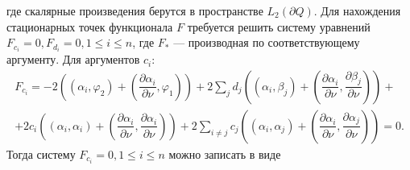 \documentclass[a4paper]{article}
\begin{document}
где скалярные произведения берутся в пространстве $L_2(\partial Q)$.
Для нахождения стационарных точек функционала $F$ требуется решить систему уравнений $F_{c_i}=0, F_{d_i}=0, 1\leq i \leq n$, где
$F_*$ --- производная по соответствующему аргументу. Для аргументов $c_i$:
\begin{multline}
  F_{c_i}=-2\left((\alpha_i,\varphi_2)+\left( \dfrac{\partial \alpha_i}{\partial \nu},\varphi_1 \right)\right)+ 2 \sum_j d_j \left((\alpha_i,\beta_j)+\left( \dfrac{\partial \alpha_i}{\partial \nu},\dfrac{\partial \beta_j}{\partial \nu} \right)\right)+\\
  +2 c_i \left((\alpha_i,\alpha_i)+\left( \dfrac{\partial \alpha_i}{\partial \nu},\dfrac{\partial \alpha_i}{\partial \nu} \right)\right)+2\sum_{i \ne j} c_j \left((\alpha_i,\alpha_j)+\left( \dfrac{\partial \alpha_i}{\partial \nu},\dfrac{\partial \alpha_j}{\partial \nu} \right)\right)=0.
\end{multline}
Тогда систему $F_{c_i}=0,1\leq i \leq n$ можно записать в виде
\end{document}
